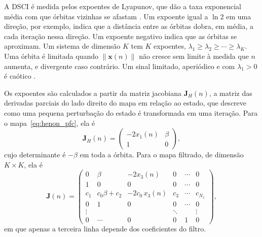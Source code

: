 \documentclass{pfccefsa}
\begin{document}
A DSCI é medida pelos expoentes de Lyapunov, que dão a taxa exponencial média
com que órbitas vizinhas se afastam \cite{Alligood1996}. Um expoente igual a
$\ln 2$ em uma direção, por exemplo, indica que a distância entre as órbitas
dobra, em média, a cada iteração nessa direção. Um expoente negativo indica que
as órbitas se aproximam. Um sistema de dimensão $K$ tem $K$ expoentes,
$\lambda_1\ge\lambda_2\ge\cdots\ge\lambda_K$. Uma órbita é limitada quando
$\|\mathbf{x}(n)\|$ não cresce sem limite à medida que $n$ aumenta, e divergente
caso contrário. Um sinal limitado, aperiódico e com $\lambda_1>0$ é caótico
\cite{Alligood1996}.

Os expoentes são calculados a partir da matriz jacobiana $\mathbf{J}_H(n)$, a
matriz das derivadas parciais do lado direito do mapa em relação ao estado, que
descreve como uma pequena perturbação do estado é transformada em uma iteração.
Para o mapa~\eqref{eq:henon_pfc}, ela é
\begin{equation}
  \mathbf{J}_H(n) = \begin{pmatrix}
    -2x_1(n) & \beta\\
    1 & 0
  \end{pmatrix},
  \label{eq:jacobiana_henon_pfc}
\end{equation}
cujo determinante é $-\beta$ em toda a órbita. Para o mapa filtrado, de dimensão
$K\times K$, ela é \cite{Borges2022sbrt,BorgesCNSNS2024}
\begin{equation}
  \mathbf{J}(n) = \begin{pmatrix}
    0 & \beta & -2x_3(n) & 0 & \cdots & 0 \\
    1 & 0 & 0 & 0 & \cdots & 0 \\
    c_1 & c_0\beta + c_2 & -2c_0\, x_3(n) & c_3 & \cdots & c_{N_z} \\
    0 & 1 & 0 & 0 & \cdots & 0 \\
    \vdots & & & \ddots & & \vdots \\
    0 & \cdots & 0 & 0 & 1 & 0
  \end{pmatrix},
  \label{eq:jacobiana_pfc}
\end{equation}
em que apenas a terceira linha depende dos coeficientes do filtro.
\end{document}
